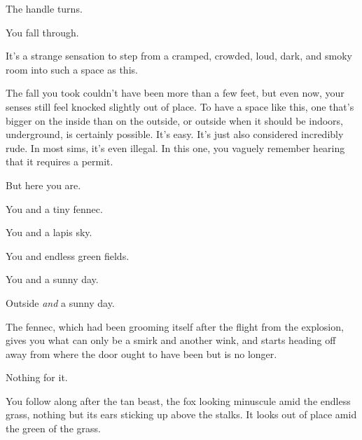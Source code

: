 \newpage

\null
\vfill

The handle turns.

\vfill
\newpage

\null
\vfill

You fall through.

\vfill

\newpage

\null
\vfill

It's a strange sensation to step from a cramped, crowded, loud, dark, and smoky room into such a space as this.

The fall you took couldn't have been more than a few feet, but even now, your senses still feel knocked slightly out of place. To have a space like this, one that's bigger on the inside than on the outside, or outside when it should be indoors, underground, is certainly possible. It's easy. It's just also considered incredibly rude. In most sims, it's even illegal. In this one, you vaguely remember hearing that it requires a permit.

But here you are.

\vfill

\newpage

\null
\vfill

You and a tiny fennec.

\null
\vfill

\newpage

\null
\vfill

You and a lapis sky.

\null
\vfill

\newpage

\null
\vfill

You and endless green fields.

\null
\vfill

\newpage

You and a sunny day.

Outside \emph{and} a sunny day.

The fennec, which had been grooming itself after the flight from the explosion, gives you what can only be a smirk and another wink, and starts heading off away from where the door ought to have been but is no longer.

Nothing for it.

You follow along after the tan beast, the fox looking minuscule amid the endless grass, nothing but its ears sticking up above the stalks. It looks out of place amid the green of the grass.

